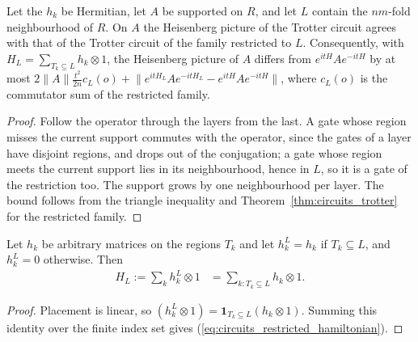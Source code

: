 \begin{theorem}
    \label{thm:circuits_trotter_restrict}
    \leanok
    Let the $h_k$ be Hermitian, let $A$ be supported on $R$, and let $L$ contain the
    $nm$-fold neighbourhood of $R$. On $A$ the Heisenberg picture of the Trotter
    circuit agrees with that of the Trotter circuit of the family restricted to $L$.
    Consequently, with $H_L=\sum_{T_k\subseteq L}h_k\otimes1$, the Heisenberg picture
    of $A$ differs from $e^{itH}Ae^{-itH}$ by at most
    $2\lVert A\rVert\frac{t^2}{2n}c_L(o)+\lVert e^{itH_L}Ae^{-itH_L}-e^{itH}Ae^{-itH}\rVert$,
    where $c_L(o)$ is the commutator sum of the restricted family.
\end{theorem}
\begin{proof}\leanok
    Follow the operator through the layers from the last. A gate whose region misses
    the current support commutes with the operator, since the gates of a layer have
    disjoint regions, and drops out of the conjugation; a gate whose region meets the
    current support lies in its neighbourhood, hence in $L$, so it is a gate of the
    restriction too. The support grows by one neighbourhood per layer. The bound
    follows from the triangle inequality and Theorem~\ref{thm:circuits_trotter} for
    the restricted family.
\end{proof}

\begin{lemma}
    \label{lem:circuits_restricted_hamiltonian}
    \leanok
    Let $h_k$ be arbitrary matrices on the regions $T_k$ and let $h^L_k=h_k$
    if $T_k\subseteq L$, and $h^L_k=0$ otherwise. Then
    \begin{align}
        \label{eq:circuits_restricted_hamiltonian}
        H_L:=\sum_k h^L_k\otimes1&=\sum_{k:T_k\subseteq L}h_k\otimes1.
    \end{align}
\end{lemma}
\begin{proof}\leanok
    Placement is linear, so $(h^L_k\otimes1)=\mathbf{1}_{T_k\subseteq L}(h_k\otimes1)$.
    Summing this identity over the finite index set gives
    (\ref{eq:circuits_restricted_hamiltonian}).
\end{proof}

